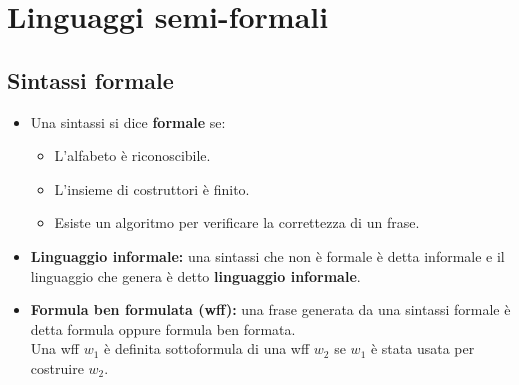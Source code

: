 \documentclass[../main.tex]{subfiles}
\begin{document}
    \section{Linguaggi semi-formali}

    \subsection{Sintassi formale}
    \begin{itemize}
        \item Una sintassi si dice \textbf{formale} se:
        \begin{itemize}
            \item L'alfabeto è riconoscibile.
            \item L'insieme di costruttori è finito.
            \item Esiste un algoritmo per verificare la correttezza di un frase.
        \end{itemize}
        \item \textbf{Linguaggio informale:} una sintassi che non è formale è detta informale e il linguaggio che genera è detto \textbf{linguaggio informale}.
        \item \textbf{Formula ben formulata (wff):} una frase generata da una sintassi formale è detta formula oppure formula ben formata.\\
            Una wff $w_1$ è definita sottoformula di una wff $w_2$ se $w_1$ è stata usata per costruire $w_2$.
    \end{itemize}
\end{document}
